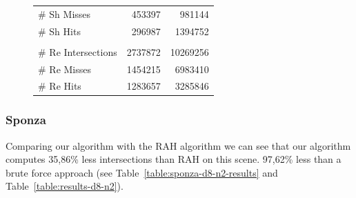 \begin{figure}[!htb]
\begin{minipage}{0.725\linewidth}
\begin{tabular}[h]{l|rr}
            \quad \# Sh Misses          & 453397    & 981144		  \\
            \quad \# Sh Hits            & 296987	& 1394752  	      \\
            & & \\
            \quad \# Re Intersections   & 2737872   & 10269256		  \\
            \quad \# Re Misses             & 1454215   & 6983410		  \\
            \quad \# Re Hits               & 1283657   & 3285846   	  \\            
        \end{tabular}
        \label{table:cornell-d8-n2-results}
    \end{minipage}
\end{figure}

\subsubsection{Sponza}


Comparing our algorithm with the RAH algorithm we can see that our algorithm computes 35,86\% less intersections than RAH on this scene. 97,62\% less than a brute force approach (see Table~\ref{table:sponza-d8-n2-results} and Table~\ref{table:results-d8-n2}).


